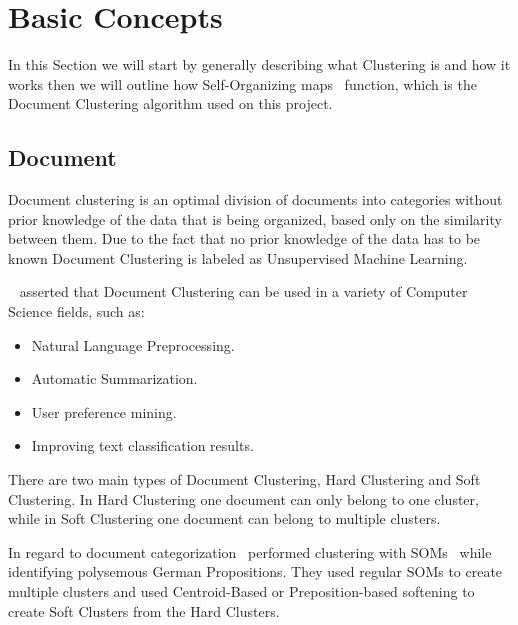 \section{Basic Concepts} 
\label{sec:basic_concepts}

In this Section we will start by generally describing what Clustering is and how it works then we will outline how Self-Organizing maps~\cite{Kohonen1990} function, which is the Document Clustering algorithm used on this project.

\subsection{Document}
\label{sub:clustering}
Document clustering is an optimal division of documents into categories without prior knowledge of the data that is being organized, based only on the similarity between them. Due to the fact that no prior knowledge of the data has to be known Document Clustering is labeled as Unsupervised Machine Learning.

~\citet{Liu2012b} asserted that Document Clustering can be used in a variety of Computer Science fields, such as:
\begin{itemize}
  \item Natural Language Preprocessing.
  \item Automatic Summarization.
  \item User preference mining.
  \item Improving text classification results.
\end{itemize}

There are two main types of Document Clustering, Hard Clustering and Soft Clustering. In Hard Clustering one document can only belong to one cluster, while in Soft Clustering one document can belong to multiple clusters. 

In regard to document categorization~\citet{Springorum1998} performed clustering with SOMs~\citep{Kohonen1990} while identifying polysemous German Propositions. They used regular SOMs to create multiple clusters and used Centroid-Based or Preposition-based softening to create Soft Clusters from the Hard Clusters.

